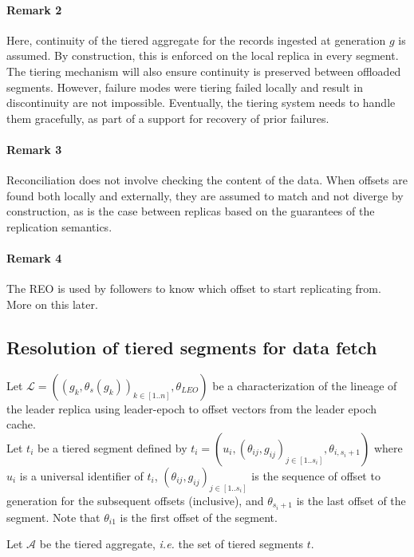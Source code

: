 \documentclass{article}
\begin{document}
\paragraph{Remark 2} Here, continuity of the tiered aggregate for the records ingested at generation $g$ is assumed. By construction, this is enforced on the local replica in every segment. The tiering mechanism will also ensure continuity is preserved between offloaded segments. However, failure modes were tiering failed locally and result in discontinuity are not impossible. Eventually, the tiering system needs to handle them gracefully, as part of a support for recovery of prior failures.

\paragraph{Remark 3} Reconciliation does not involve checking the content of the data. When offsets are found both locally and externally, they are assumed to match and not diverge by construction, as is the case between replicas based on the guarantees of the replication semantics.

\paragraph{Remark 4} The REO is used by followers to know which offset to start replicating from. More on this later.

\subsection{Resolution of tiered segments for data fetch}

Let $\mathcal{L}=((g_k,\theta_s(g_k))_{k \in [1..n]}, \theta_{LEO})$ be a characterization of the lineage of the leader replica using leader-epoch to offset vectors from the leader epoch cache.\\

Let $t_i$ be a tiered segment defined by $t_i = (u_i, (\theta_{ij}, g_{ij})_{j \in [1..s_i]}, \theta_{i,s_i + 1} )$ where $u_i$ is a universal identifier of $t_i$, $(\theta_{ij}, g_{ij})_{j \in [1..s_i]}$ is the sequence of offset to generation for the subsequent offsets (inclusive), and $\theta_{s_i+1}$ is the last offset of the segment. Note that $\theta_{i1}$ is the first offset of the segment.

Let $\mathcal{A}$ be the tiered aggregate, \textit{i.e.} the set of tiered segments $t$.
\end{document}
